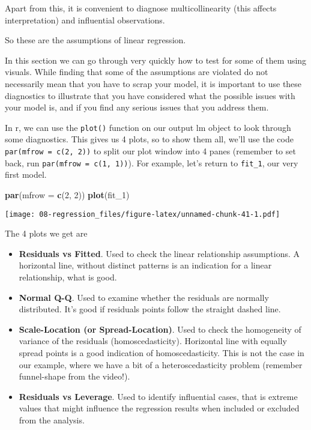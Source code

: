 \documentclass[
]{book}
\newenvironment{Shaded}{\begin{snugshade}}{\end{snugshade}}
\newcommand{\AttributeTok}[1]{\textcolor[rgb]{0.13,0.29,0.53}{#1}}
\newcommand{\DecValTok}[1]{\textcolor[rgb]{0.00,0.00,0.81}{#1}}
\newcommand{\FunctionTok}[1]{\textcolor[rgb]{0.13,0.29,0.53}{\textbf{#1}}}
\newcommand{\NormalTok}[1]{#1}
\providecommand{\tightlist}{%
  \setlength{\itemsep}{0pt}\setlength{\parskip}{0pt}}
\begin{document}
Apart from this, it is convenient to diagnose multicollinearity (this affects interpretation) and influential observations.

So these are the assumptions of linear regression.

In this section we can go through very quickly how to test for some of them using visuals. While finding that some of the assumptions are violated do not necessarily mean that you have to scrap your model, it is important to use these diagnostics to illustrate that you have considered what the possible issues with your model is, and if you find any serious issues that you address them.

In r, we can use the \texttt{plot()} function on our output lm object to look through some diagnostics. This gives us 4 plots, so to show them all, we'll use the code \texttt{par(mfrow\ =\ c(2,\ 2))} to split our plot window into 4 panes (remember to set back, run \texttt{par(mfrow\ =\ c(1,\ 1))}). For example, let's return to \texttt{fit\_1}, our very first model.

\begin{Shaded}
\begin{Highlighting}[]
\FunctionTok{par}\NormalTok{(}\AttributeTok{mfrow =} \FunctionTok{c}\NormalTok{(}\DecValTok{2}\NormalTok{, }\DecValTok{2}\NormalTok{))}
\FunctionTok{plot}\NormalTok{(fit\_1)}
\end{Highlighting}
\end{Shaded}

\texttt{[image: 08-regression\_files/figure-latex/unnamed-chunk-41-1.pdf]}

The 4 plots we get are

\begin{itemize}
\tightlist
\item
  \textbf{Residuals vs Fitted}. Used to check the linear relationship assumptions. A horizontal line, without distinct patterns is an indication for a linear relationship, what is good.
\item
  \textbf{Normal Q-Q}. Used to examine whether the residuals are normally distributed. It's good if residuals points follow the straight dashed line.
\item
  \textbf{Scale-Location (or Spread-Location)}. Used to check the homogeneity of variance of the residuals (homoscedasticity). Horizontal line with equally spread points is a good indication of homoscedasticity. This is not the case in our example, where we have a bit of a heteroscedasticity problem (remember funnel-shape from the video!).
\item
  \textbf{Residuals vs Leverage}. Used to identify influential cases, that is extreme values that might influence the regression results when included or excluded from the analysis.
\end{itemize}
\end{document}
